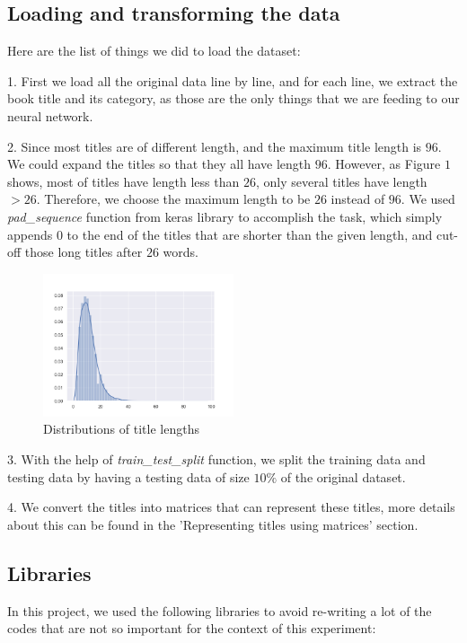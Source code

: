 \documentclass[jou,apacite, 10px]{apa6}
\begin{document}
\subsection{Loading and transforming the data}
Here are the list of things we did to load the dataset:

\rule{0pt}{4ex}  1. First we load all the original data line by line, and for each line, we extract the book title and its category, as those are the only things that we are feeding to our neural network.

\rule{0pt}{4ex}  2. Since most titles are of different length, and the maximum title length is $96$. We could expand the titles so that they all have length $96$. However, as Figure $1$ shows, most of titles have length less than $26$, only several titles have length $>26$. Therefore, we choose the maximum length to be $26$ instead of $96$. We used \textit{pad\_sequence} function from keras library to accomplish the task, which simply appends $0$ to the end of the titles that are shorter than the given length, and cut-off those long titles after $26$ words.

\begin{figure}[h!]
\captionsetup{justification=centering}
     \includegraphics[width=0.5\textwidth]{images/title_lengths}
     \caption{Distributions of title lengths}
\end{figure}

\rule{0pt}{4ex}  3. With the help of \textit{train\_test\_split} function, we split the training data and testing data by having a testing data of size $10\%$ of the original dataset.

\rule{0pt}{4ex}  4. We convert the titles into matrices that can represent these titles, more details about this can be found in the 'Representing titles using matrices' section.

\subsection{Libraries}
In this project, we used the following libraries to avoid re-writing a lot of the codes that are not so important for the context of this experiment:
\end{document}
